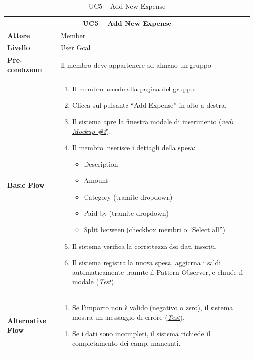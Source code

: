 \begin{table}[htbp]
    \centering
    \footnotesize
    \begin{tabularx}{\textwidth}{|l|X|}
        \hline
        \multicolumn{2}{|c|}{\textbf{UC5 -- Add New Expense}} \\
        \hline
        \textbf{Attore} & Member \\
        \hline
        \textbf{Livello} & User Goal \\
        \hline
        \textbf{Pre-condizioni} & Il membro deve appartenere ad almeno un gruppo. \\
        \hline
        \textbf{Basic Flow} & 
        \begin{enumerate}[leftmargin=*, nosep, topsep=3pt]
            \item Il membro accede alla pagina del gruppo.
            \item Clicca sul pulsante ``Add Expense'' in alto a destra.
            \item Il sistema apre la finestra modale di inserimento (\hyperref[fig:add_expense]{\textit{vedi Mockup \#3}}).
            \item Il membro inserisce i dettagli della spesa:
            \begin{itemize}[nosep, label={--}, topsep=2pt]
                \item Description 
                \item Amount
                \item Category (tramite dropdown)
                \item Paid by (tramite dropdown)
                \item Split between (checkbox membri o ``Select all'')
            \end{itemize}
            \item Il sistema verifica la correttezza dei dati inseriti.
            \item Il sistema registra la nuova spesa, aggiorna i saldi automaticamente tramite il Pattern Observer, e chiude il modale (\hyperref[test:uc5_balances]{\textit{Test}}).
        \end{enumerate} \\
        \hline
        \textbf{Alternative Flow} & 
        \begin{enumerate}[label=4\alph*., leftmargin=*, nosep, topsep=3pt]
            \item Se l'importo non è valido (negativo o zero), il sistema mostra un messaggio di errore (\hyperref[test:uc5_invalid_amount]{\textit{Test}}).
        \end{enumerate}
        \begin{enumerate}[label=5\alph*., leftmargin=*, nosep, topsep=3pt]
            \item Se i dati sono incompleti, il sistema richiede il completamento dei campi mancanti.
        \end{enumerate} \\
        \hline
    \end{tabularx}
    \caption{UC5 -- Add New Expense}
    \label{tab:uc5}
\end{table}


